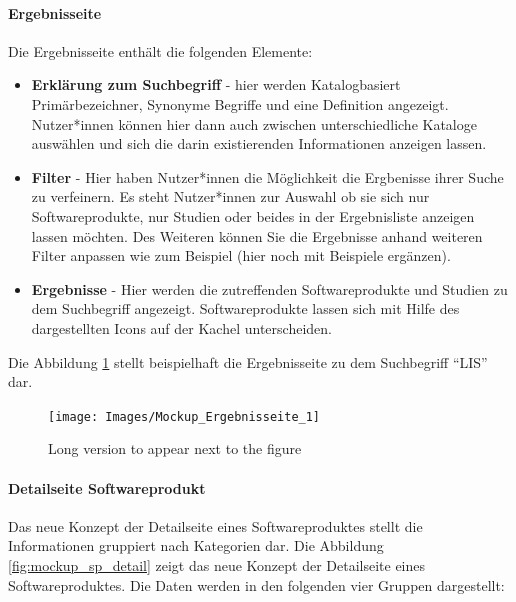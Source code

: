 \clearpage

\paragraph{Ergebnisseite}

Die Ergebnisseite enthält die folgenden Elemente:

\begin{itemize}
\item \textbf{Erklärung zum Suchbegriff} - hier werden Katalogbasiert Primärbezeichner, Synonyme Begriffe und eine Definition angezeigt. Nutzer*innen können hier dann auch zwischen unterschiedliche Kataloge auswählen und sich die darin existierenden Informationen anzeigen lassen.
\item \textbf {Filter} - Hier haben Nutzer*innen die Möglichkeit die Ergbenisse ihrer Suche zu verfeinern. Es steht Nutzer*innen zur Auswahl ob sie sich nur Softwareprodukte, nur Studien oder beides in der Ergebnisliste anzeigen lassen möchten. Des Weiteren können Sie die Ergebnisse anhand weiteren Filter anpassen wie zum Beispiel (hier noch mit Beispiele ergänzen).
\item \textbf{Ergebnisse} - Hier werden die zutreffenden Softwareprodukte und Studien zu dem Suchbegriff angezeigt. Softwareprodukte lassen sich mit Hilfe des dargestellten Icons auf der Kachel unterscheiden.
\end{itemize}

Die Abbildung \ref{fig:mockup_results} stellt beispielhaft die Ergebnisseite zu dem Suchbegriff \enquote{LIS} dar.

\begin{figure}
	\centering
    	\texttt{[image: Images/Mockup\_Ergebnisseite\_1]}
   	\caption[Mockup -- Ergebnisseite]{Long version to appear next to the figure}
   	\label{fig:mockup_results}
\end{figure}

\clearpage

\paragraph{Detailseite Softwareprodukt}

Das neue Konzept der Detailseite eines Softwareproduktes stellt die Informationen gruppiert nach Kategorien dar.
Die Abbildung \ref{fig:mockup_sp_detail} zeigt das neue Konzept der Detailseite eines Softwareproduktes.
Die Daten werden in den folgenden vier Gruppen dargestellt:

